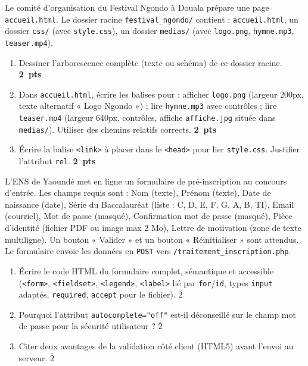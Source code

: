 \documentclass[11pt]{article}
\begin{document}
\begin{exercice}
Le comité d'organisation du Festival Ngondo à Douala prépare une page \texttt{accueil.html}. Le dossier racine \texttt{festival\_ngondo/} contient : \texttt{accueil.html}, un dossier \texttt{css/} (avec \texttt{style.css}), un dossier \texttt{medias/} (avec \texttt{logo.png}, \texttt{hymne.mp3}, \texttt{teaser.mp4}).
\begin{enumerate}
    \item Dessiner l'arborescence complète (texte ou schéma) de ce dossier racine. \hfill\textbf{2~pts}
    \item Dans \texttt{accueil.html}, écrire les balises pour : afficher \texttt{logo.png} (largeur 200px, texte alternatif « Logo Ngondo ») ; lire \texttt{hymne.mp3} avec contrôles ; lire \texttt{teaser.mp4} (largeur 640px, contrôles, affiche \texttt{affiche.jpg} située dans \texttt{medias/}). Utiliser des chemins relatifs corrects. \hfill\textbf{2~pts}
    \item Écrire la balise \texttt{<link>} à placer dans le \texttt{<head>} pour lier \texttt{style.css}. Justifier l'attribut \texttt{rel}. \hfill\textbf{2~pts}
\end{enumerate}
\end{exercice}

\begin{exercice}
L'ENS de Yaoundé met en ligne un formulaire de pré-inscription au concours d'entrée. Les champs requis sont : Nom (texte), Prénom (texte), Date de naissance (date), Série du Baccalauréat (liste : C, D, E, F, G, A, B, TI), Email (courriel), Mot de passe (masqué), Confirmation mot de passe (masqué), Pièce d'identité (fichier PDF ou image max 2 Mo), Lettre de motivation (zone de texte multiligne). Un bouton « Valider » et un bouton « Réinitialiser » sont attendus. Le formulaire envoie les données en \texttt{POST} vers \texttt{/traitement\_inscription.php}.
\begin{enumerate}
    \item Écrire le code HTML du formulaire complet, sémantique et accessible (\texttt{<form>}, \texttt{<fieldset>}, \texttt{<legend>}, \texttt{<label>} lié par \texttt{for}/\texttt{id}, types \texttt{input} adaptés, \texttt{required}, \texttt{accept} pour le fichier). $\bar{2}$
    \item Pourquoi l'attribut \texttt{autocomplete="off"} est-il déconseillé sur le champ mot de passe pour la sécurité utilisateur ? $\bar{2}$
    \item Citer deux avantages de la validation côté client (HTML5) avant l'envoi au serveur. $\bar{2}$
\end{enumerate}
\end{exercice}
\end{document}
